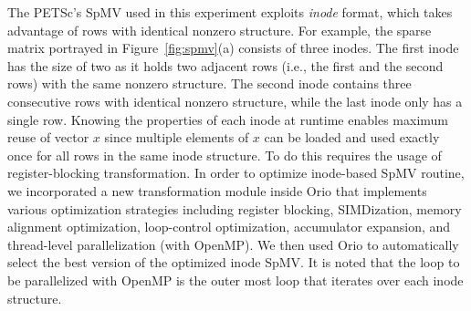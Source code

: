 The PETSc's SpMV used in this experiment exploits \textit{inode}
format, which takes advantage of rows with identical nonzero
structure. For example, the sparse matrix portrayed in
Figure~\ref{fig:spmv}(a) consists of three inodes. The first inode has
the size of two as it holds two adjacent rows (i.e., the first and the
second rows) with the same nonzero structure. The second inode
contains three consecutive rows with identical nonzero structure,
while the last inode only has a single row. Knowing the properties of
each inode at runtime enables maximum reuse of vector $x$ since
multiple elements of $x$ can be loaded and used exactly once for all
rows in the same inode structure. To do this requires the usage of
register-blocking transformation. In order to optimize inode-based
SpMV routine, we incorporated a new transformation module inside Orio
that implements various optimization strategies including register
blocking, SIMDization, memory alignment optimization, loop-control
optimization, accumulator expansion, and thread-level parallelization
(with OpenMP). We then used Orio to automatically select the best
version of the optimized inode SpMV. It is noted that the loop to be
parallelized with OpenMP is the outer most loop that iterates over
each inode structure.


